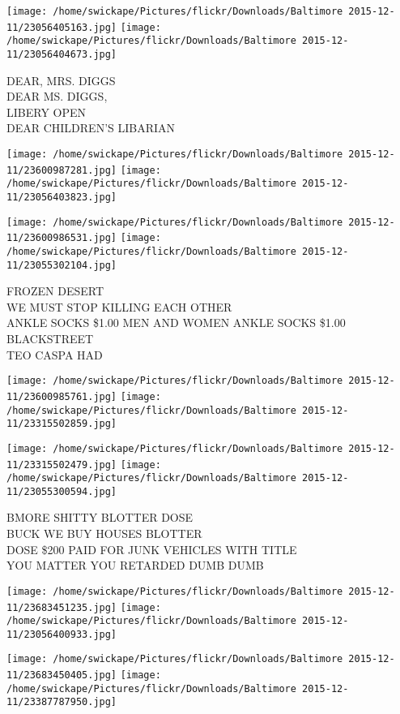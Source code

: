 \documentclass[10pt,letterpaper]{article}
\begin{document}
\texttt{[image: /home/swickape/Pictures/flickr/Downloads/Baltimore 2015-12-11/23056405163.jpg]}
\texttt{[image: /home/swickape/Pictures/flickr/Downloads/Baltimore 2015-12-11/23056404673.jpg]}

DEAR, MRS. DIGGS\\
DEAR MS. DIGGS,\\
LIBERY OPEN\\
DEAR CHILDREN'S LIBARIAN
\pagebreak

\texttt{[image: /home/swickape/Pictures/flickr/Downloads/Baltimore 2015-12-11/23600987281.jpg]}
\texttt{[image: /home/swickape/Pictures/flickr/Downloads/Baltimore 2015-12-11/23056403823.jpg]}

\texttt{[image: /home/swickape/Pictures/flickr/Downloads/Baltimore 2015-12-11/23600986531.jpg]}
\texttt{[image: /home/swickape/Pictures/flickr/Downloads/Baltimore 2015-12-11/23055302104.jpg]}

FROZEN DESERT\\
WE MUST STOP KILLING EACH OTHER\\
ANKLE SOCKS \$1.00 MEN AND WOMEN ANKLE SOCKS \$1.00 BLACKSTREET\\
TEO CASPA HAD
\pagebreak

\texttt{[image: /home/swickape/Pictures/flickr/Downloads/Baltimore 2015-12-11/23600985761.jpg]}
\texttt{[image: /home/swickape/Pictures/flickr/Downloads/Baltimore 2015-12-11/23315502859.jpg]}

\texttt{[image: /home/swickape/Pictures/flickr/Downloads/Baltimore 2015-12-11/23315502479.jpg]}
\texttt{[image: /home/swickape/Pictures/flickr/Downloads/Baltimore 2015-12-11/23055300594.jpg]}

BMORE SHITTY BLOTTER DOSE\\
BUCK WE BUY HOUSES BLOTTER\\
DOSE \$200 PAID FOR JUNK VEHICLES WITH TITLE\\
YOU MATTER YOU RETARDED DUMB DUMB
\pagebreak

\texttt{[image: /home/swickape/Pictures/flickr/Downloads/Baltimore 2015-12-11/23683451235.jpg]}
\texttt{[image: /home/swickape/Pictures/flickr/Downloads/Baltimore 2015-12-11/23056400933.jpg]}

\texttt{[image: /home/swickape/Pictures/flickr/Downloads/Baltimore 2015-12-11/23683450405.jpg]}
\texttt{[image: /home/swickape/Pictures/flickr/Downloads/Baltimore 2015-12-11/23387787950.jpg]}
\end{document}

